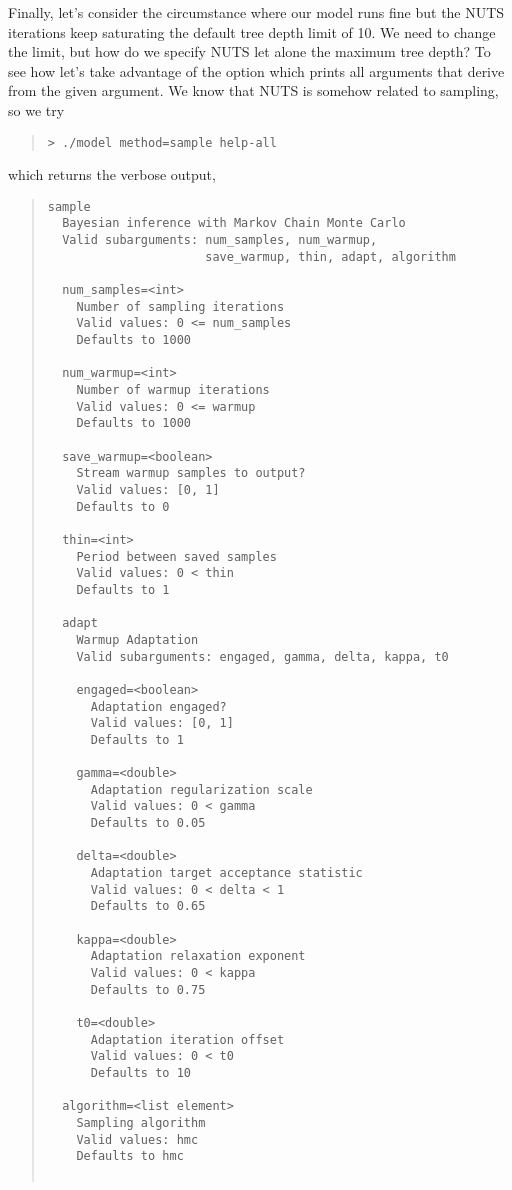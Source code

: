 Finally, let's consider the circumstance where our model runs fine but
the NUTS iterations keep saturating the default tree depth limit of 10.  We need
to change the limit, but how do we specify NUTS let alone the maximum tree depth?
To see how let's take advantage of the  option which prints all
arguments that derive from the given argument.  We know that NUTS is somehow
related to sampling, so we try
%
\begin{quote}
\begin{Verbatim}[fontshape=sl]
> ./model method=sample help-all
\end{Verbatim}
\end{quote}
%
which returns the verbose output,
%
%
\begin{quote}
\begin{Verbatim}[fontsize=\small]
sample
  Bayesian inference with Markov Chain Monte Carlo
  Valid subarguments: num_samples, num_warmup,
                      save_warmup, thin, adapt, algorithm

  num_samples=<int>
    Number of sampling iterations
    Valid values: 0 <= num_samples
    Defaults to 1000

  num_warmup=<int>
    Number of warmup iterations
    Valid values: 0 <= warmup
    Defaults to 1000

  save_warmup=<boolean>
    Stream warmup samples to output?
    Valid values: [0, 1]
    Defaults to 0

  thin=<int>
    Period between saved samples
    Valid values: 0 < thin
    Defaults to 1

  adapt
    Warmup Adaptation
    Valid subarguments: engaged, gamma, delta, kappa, t0

    engaged=<boolean>
      Adaptation engaged?
      Valid values: [0, 1]
      Defaults to 1

    gamma=<double>
      Adaptation regularization scale
      Valid values: 0 < gamma
      Defaults to 0.05

    delta=<double>
      Adaptation target acceptance statistic
      Valid values: 0 < delta < 1
      Defaults to 0.65

    kappa=<double>
      Adaptation relaxation exponent
      Valid values: 0 < kappa
      Defaults to 0.75

    t0=<double>
      Adaptation iteration offset
      Valid values: 0 < t0
      Defaults to 10

  algorithm=<list element>
    Sampling algorithm
    Valid values: hmc
    Defaults to hmc


\end{Verbatim}
\end{quote}
